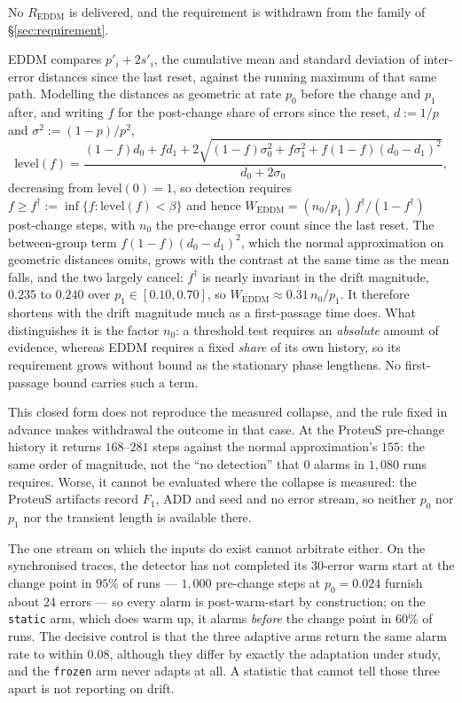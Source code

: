 No $R_{\mathrm{EDDM}}$ is delivered, and the requirement is withdrawn from the
family of \S\ref{sec:requirement}.

EDDM compares $p'_i + 2s'_i$, the cumulative mean and standard deviation of
inter-error distances since the last reset, against the running maximum of that
same path. Modelling the distances as geometric at rate $p_0$ before the change
and $p_1$ after, and writing $f$ for the post-change share of errors since the
reset, $d := 1/p$ and $\sigma^2 := (1-p)/p^2$,
\begin{equation}\label{eq:eddm_level}
  \mathrm{level}(f) =
  \frac{(1-f)d_0 + f d_1 + 2\sqrt{(1-f)\sigma_0^2 + f\sigma_1^2
        + f(1-f)(d_0-d_1)^2}}{d_0 + 2\sigma_0},
\end{equation}
decreasing from $\mathrm{level}(0) = 1$, so detection requires
$f \ge f^\dagger := \inf\{f : \mathrm{level}(f) < \beta\}$ and hence
$W_{\mathrm{EDDM}} = (n_0/p_1)\,f^\dagger/(1-f^\dagger)$ post-change steps,
with $n_0$ the pre-change error count since the last reset. The between-group
term $f(1-f)(d_0-d_1)^2$, which the normal approximation on geometric distances
omits, grows with the contrast at the same time as the mean falls, and the two
largely cancel: $f^\dagger$ is nearly invariant in the drift magnitude, $0.235$
to $0.240$ over $p_1 \in [0.10, 0.70]$, so $W_{\mathrm{EDDM}} \approx
0.31\, n_0/p_1$. It therefore shortens with the drift magnitude much as a
first-passage time does. What distinguishes it is the factor $n_0$: a threshold
test requires an \emph{absolute} amount of evidence, whereas EDDM requires a
fixed \emph{share} of its own history, so its requirement grows without bound as
the stationary phase lengthens. No first-passage bound carries such a term.

This closed form does not reproduce the measured collapse, and the rule fixed in
advance makes withdrawal the outcome in that case. At the ProteuS pre-change
history it returns $168$--$281$ steps against the normal approximation's $155$:
the same order of magnitude, not the ``no detection'' that $0$ alarms in
$1{,}080$ runs requires. Worse, it cannot be evaluated where the collapse is
measured: the ProteuS artifacts record $F_1$, ADD and seed and no error stream,
so neither $p_0$ nor $p_1$ nor the transient length is available there.

The one stream on which the inputs do exist cannot arbitrate either. On the
synchronised traces, the detector has not completed its $30$-error warm start at
the change point in $95\%$ of runs --- $1{,}000$ pre-change steps at
$p_0 = 0.024$ furnish about $24$ errors --- so every alarm is post-warm-start by
construction; on the \texttt{static} arm, which does warm up, it alarms
\emph{before} the change point in $60\%$ of runs. The decisive control is that
the three adaptive arms return the same alarm rate to within $0.08$, although
they differ by exactly the adaptation under study, and the \texttt{frozen} arm
never adapts at all. A statistic that cannot tell those three apart is not
reporting on drift.

